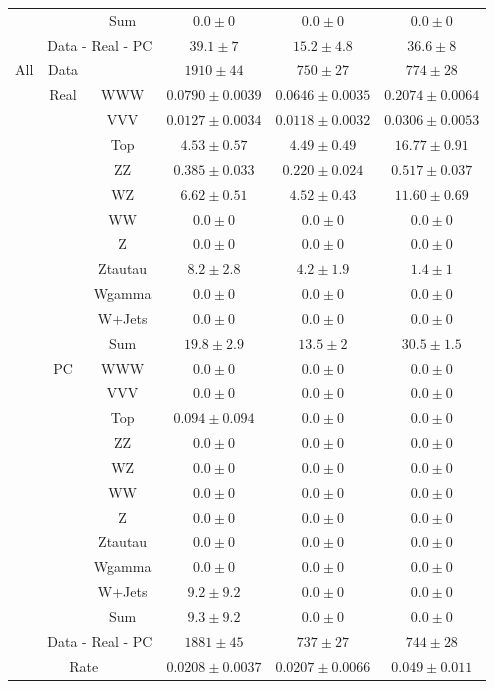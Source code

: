 \begin{tabular}{|c|cc||c|c|c|}
&& Sum &  $0.0 \pm 0$ &  $0.0 \pm 0$ &  $0.0 \pm 0$\\ 
\cline{2-6}
\cline{2-6}
&\multicolumn{2}{|c||}{Data - Real - PC} &  $39.1 \pm 7$ &  $15.2 \pm 4.8$ &  $36.6 \pm 8$\\ 
\hline
\hline
\multirow{23}{*}{All}&Data &  & $1910 \pm 44$ &  $750 \pm 27$ &  $774 \pm 28$\\ 
\cline{2-6}
&\multirow{11}{*}{Real}& WWW &  $0.0790 \pm 0.0039$ &  $0.0646 \pm 0.0035$ &  $0.2074 \pm 0.0064$\\ 
&& VVV &  $0.0127 \pm 0.0034$ &  $0.0118 \pm 0.0032$ &  $0.0306 \pm 0.0053$\\ 
&& Top &  $4.53 \pm 0.57$ &  $4.49 \pm 0.49$ &  $16.77 \pm 0.91$\\ 
&& ZZ &  $0.385 \pm 0.033$ &  $0.220 \pm 0.024$ &  $0.517 \pm 0.037$\\ 
&& WZ &  $6.62 \pm 0.51$ &  $4.52 \pm 0.43$ &  $11.60 \pm 0.69$\\ 
&& WW &  $0.0 \pm 0$ &  $0.0 \pm 0$ &  $0.0 \pm 0$\\ 
&& Z &  $0.0 \pm 0$ &  $0.0 \pm 0$ &  $0.0 \pm 0$\\ 
&& Ztautau &  $8.2 \pm 2.8$ &  $4.2 \pm 1.9$ &  $1.4 \pm 1$\\ 
&& Wgamma &  $0.0 \pm 0$ &  $0.0 \pm 0$ &  $0.0 \pm 0$\\ 
&& W+Jets &  $0.0 \pm 0$ &  $0.0 \pm 0$ &  $0.0 \pm 0$\\ 
\cline{3-6}
&& Sum &  $19.8 \pm 2.9$ &  $13.5 \pm 2$ &  $30.5 \pm 1.5$\\ 
\cline{2-6}
\cline{2-6}
&\multirow{11}{*}{PC}& WWW &  $0.0 \pm 0$ &  $0.0 \pm 0$ &  $0.0 \pm 0$\\ 
&& VVV &  $0.0 \pm 0$ &  $0.0 \pm 0$ &  $0.0 \pm 0$\\ 
&& Top &  $0.094 \pm 0.094$ &  $0.0 \pm 0$ &  $0.0 \pm 0$\\ 
&& ZZ &  $0.0 \pm 0$ &  $0.0 \pm 0$ &  $0.0 \pm 0$\\ 
&& WZ &  $0.0 \pm 0$ &  $0.0 \pm 0$ &  $0.0 \pm 0$\\ 
&& WW &  $0.0 \pm 0$ &  $0.0 \pm 0$ &  $0.0 \pm 0$\\ 
&& Z &  $0.0 \pm 0$ &  $0.0 \pm 0$ &  $0.0 \pm 0$\\ 
&& Ztautau &  $0.0 \pm 0$ &  $0.0 \pm 0$ &  $0.0 \pm 0$\\ 
&& Wgamma &  $0.0 \pm 0$ &  $0.0 \pm 0$ &  $0.0 \pm 0$\\ 
&& W+Jets &  $9.2 \pm 9.2$ &  $0.0 \pm 0$ &  $0.0 \pm 0$\\ 
\cline{3-6}
&& Sum &  $9.3 \pm 9.2$ &  $0.0 \pm 0$ &  $0.0 \pm 0$\\ 
\cline{2-6}
\cline{2-6}
&\multicolumn{2}{|c||}{Data - Real - PC} &  $1881 \pm 45$ &  $737 \pm 27$ &  $744 \pm 28$\\ 
\hline
\hline
\multicolumn{3}{|c||}{Rate} &  $0.0208 \pm 0.0037$ &  $0.0207 \pm 0.0066$ &  $0.049 \pm 0.011$\\ 
\hline
\end{tabular}

